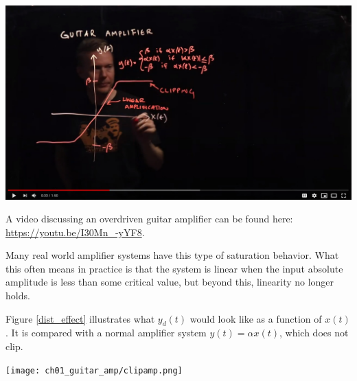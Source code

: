 \begin{marginfigure}
   \begin{center}
      \includegraphics[width=\textwidth]{ch04/figures/ampvid.jpg}
   \end{center}
   \caption{A video discussing an overdriven guitar amplifier can be found here: \url{https://youtu.be/I30Mn_-yYF8}.}
\end{marginfigure}
Many real world amplifier systems have this type of saturation behavior. 
What this often means in practice is that the system is linear when the input absolute 
amplitude is less than some critical value, but beyond this, linearity no longer holds.

Figure \ref{dist_effect} illustrates what $y_d(t)$ would look like as a function of $x(t)$. 
It is compared with a normal amplifier system $y(t)=\alpha x(t)$, which does not clip.

   \begin{center}
      \texttt{[image: ch01\_guitar\_amp/clipamp.png]}
   \end{center}
\fi

